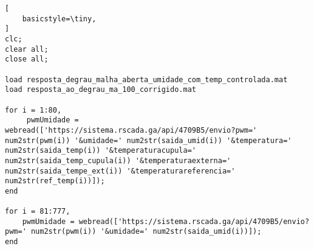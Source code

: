 \label{an:anexo-incubadora}

\begin{lstlisting}[
    basicstyle=\tiny,
]
clc;
clear all;
close all;

load resposta_degrau_malha_aberta_umidade_com_temp_controlada.mat
load resposta_ao_degrau_ma_100_corrigido.mat

for i = 1:80,
     pwmUmidade = webread(['https://sistema.rscada.ga/api/4709B5/envio?pwm=' num2str(pwm(i)) '&umidade=' num2str(saida_umid(i)) '&temperatura=' num2str(saida_temp(i)) '&temperaturacupula=' num2str(saida_temp_cupula(i)) '&temperaturaexterna=' num2str(saida_tempe_ext(i)) '&temperaturareferencia=' num2str(ref_temp(i))]);
end

for i = 81:777,
    pwmUmidade = webread(['https://sistema.rscada.ga/api/4709B5/envio?pwm=' num2str(pwm(i)) '&umidade=' num2str(saida_umid(i))]);
end
\end{lstlisting}
